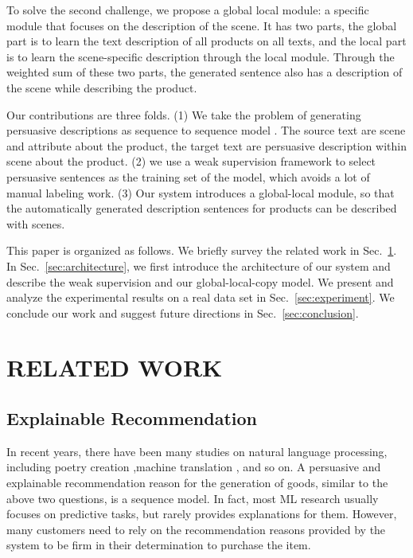 \documentclass[sigconf]{acmart}
\begin{document}
To solve the second challenge, we propose a global local module: a specific module that focuses on the description of the scene. It has two parts, the global part is to learn the text description of all products on all texts, and the local part is to learn the scene-specific description through the local module. Through the weighted sum of these two parts, the generated sentence also has a description of the scene while describing the product.

Our contributions are three folds. (1) We take the problem of generating persuasive descriptions as sequence to sequence model . The source text are scene and attribute about the product, the target text are persuasive description within scene about the product. (2) we use a weak supervision framework to select persuasive sentences as the training set of the model, which avoids a lot of manual labeling work. (3) Our system introduces a global-local module, so that the automatically generated description sentences for products can be described with scenes. 

This paper is organized as follows. We briefly survey the related work in Sec.~\ref{sec:related}. In Sec.~\ref{sec:architecture}, we first introduce the architecture of our system and describe the weak supervision and our global-local-copy model. We present and analyze the experimental results on a real data set in Sec.~\ref{sec:experiment}. We conclude our work and suggest future directions in Sec.~\ref{sec:conclusion}.

\section{RELATED WORK}\label{sec:related}
\subsection{Explainable Recommendation}

In recent years, there have been many studies on natural language processing, including poetry creation \cite{Colton2012Full,Oliveira2015Tra,Ghazvininejad2016Generating,Yi2017Generating,Zhang2014Chinese,wang2016chinese},machine translation \cite{Kalchbrenner2016Neural,Zhou2016Deep,Wu2016Google}, and so on. A persuasive and explainable recommendation reason for the generation of goods, similar to the above two questions, is a sequence model. In fact, most ML research usually focuses on predictive tasks, but rarely provides explanations for them. However, many customers need to rely on the recommendation reasons provided by the system to be firm in their determination to purchase the item.
\end{document}
